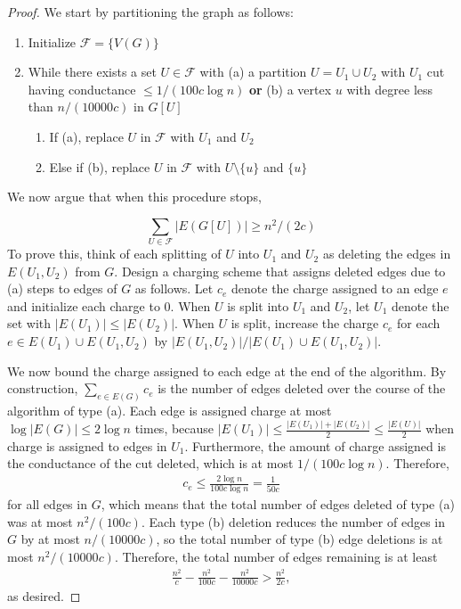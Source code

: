 \begin{proof}
We start by partitioning the graph as follows:

\begin{enumerate}
    \item Initialize $\mathcal F = \{V(G)\}$
    
    \item While there exists a set $U\in \mathcal F$ with (a) a partition $U = U_1\cup U_2$ with $U_1$ cut having conductance $\le 1/(100 c\log n)$ \textbf{or} (b) a vertex $u$ with degree less than $n/(10000c)$ in $G[U]$
    
    \begin{enumerate}
        \item If (a), replace $U$ in $\mathcal F$ with $U_1$ and $U_2$
        \item Else if (b), replace $U$ in $\mathcal F$ with $U\setminus \{u\}$ and $\{u\}$
    \end{enumerate}
\end{enumerate}
We now argue that when this procedure stops,

$$\sum_{U\in \mathcal F} |E(G[U])| \ge n^2/(2c)$$
To prove this, think of each splitting of $U$ into $U_1$ and $U_2$ as deleting the edges in $E(U_1,U_2)$ from $G$. Design a charging scheme that assigns deleted edges due to (a) steps to edges of $G$ as follows. Let $c_e$ denote the charge assigned to an edge $e$ and initialize each charge to 0. When $U$ is split into $U_1$ and $U_2$, let $U_1$ denote the set with $|E(U_1)| \le |E(U_2)|$. When $U$ is split, increase the charge $c_e$ for each $e\in E(U_1)\cup E(U_1,U_2)$ by $|E(U_1,U_2)|/|E(U_1)\cup E(U_1,U_2)|$.

We now bound the charge assigned to each edge at the end of the algorithm. By construction, $\sum_{e\in E(G)} c_e$ is the number of edges deleted over the course of the algorithm of type (a). Each edge is assigned charge at most $\log |E(G)|\le 2\log n$ times, because $|E(U_1)|\le \frac{|E(U_1)| + |E(U_2)|}{2}\le \frac{|E(U)|}{2}$ when charge is assigned to edges in $U_1$. Furthermore, the amount of charge assigned is the conductance of the cut deleted, which is at most $1/(100c\log n)$. Therefore, 
\begin{align*}
c_e\le \frac{ 2 \log n } { 100c\log n } = \frac{ 1 }{ 50c }
\end{align*}
for all edges in $G$, which means that the total number of edges deleted of type (a) was at most $n^2/(100c)$. Each type (b) deletion reduces the number of edges in $G$ by at most $n/(10000c)$, so the total number of type (b) edge deletions is at most $n^2/(10000c)$. Therefore, the total number of edges remaining is at least 
\begin{align*}
\frac{ n^2 }{ c } - \frac{ n^2 }{ 100c } - \frac{ n^2 }{ 10000c }  > \frac{ n^2 }{ 2c },
\end{align*}
as desired.


\end{proof}
